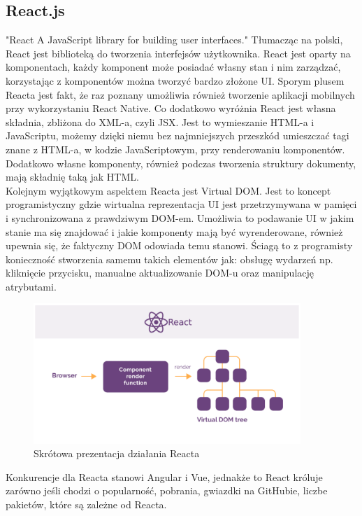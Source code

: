 \documentclass[12pt]{article}
\begin{document}
\begin{sloppypar}
{\subsection{React.js}
{
  "React A JavaScript library for building user interfaces."\cite{react} Tłumacząc na polski, React jest biblioteką do tworzenia interfejsów użytkownika. 
  React jest oparty na komponentach, każdy komponent może posiadać własny stan i nim zarządzać, korzystając z komponentów można tworzyć bardzo złożone UI. 
  Sporym plusem Reacta jest fakt, że raz poznany umożliwia również tworzenie aplikacji mobilnych przy wykorzystaniu React Native. Co dodatkowo wyróżnia React 
  jest własna składnia, zbliżona do XML-a, czyli JSX. Jest to wymieszanie HTML-a i JavaScriptu, możemy dzięki niemu bez najmniejszych przeszkód umieszczać 
  tagi znane z HTML-a, w kodzie JavaScriptowym, przy renderowaniu komponentów. Dodatkowo własne komponenty, również podczas tworzenia struktury dokumenty, mają 
  składnię taką jak HTML. \\
  Kolejnym wyjątkowym aspektem Reacta jest Virtual DOM. Jest to koncept programistyczny gdzie wirtualna reprezentacja UI jest przetrzymywana w pamięci i synchronizowana 
  z prawdziwym DOM-em. Umożliwia to podawanie UI w jakim stanie ma się znajdować i jakie komponenty mają być wyrenderowane, również upewnia się, że faktyczny DOM odowiada temu stanowi. 
  Ściagą to z programisty konieczność stworzenia samemu takich elementów jak: obsługę wydarzeń np. kliknięcie przycisku, manualne aktualizowanie DOM-u oraz manipulację atrybutami.
  \begin{figure}[H]
    \centering
    \includegraphics[width=0.9\textwidth]{how_react_works.PNG}
    \caption{Skrótowa prezentacja działania Reacta}
    \label{fig:how-react-works}
  \end{figure}
  Konkurencje dla Reacta stanowi Angular i Vue, jednakże to React króluje zarówno jeśli chodzi o popularność, pobrania, gwiazdki na GitHubie, liczbe pakietów, które są zależne od Reacta. 
}}
\end{sloppypar}
\end{document}
